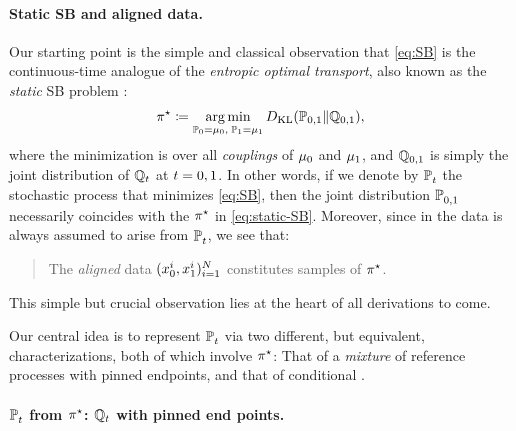 \paragraph{Static SB and aligned data.}

Our starting point is the simple and classical observation that \eqref{eq:SB} is the continuous-time analogue of the \emph{entropic optimal transport}, also known as the \emph{static} \acrlong{SB} problem \citep{leonard2013survey,chen2021stochastic,peyre2019computational}:
\begin{equation}
\label{eq:static-SB}
\Pssol \defeq \argmin_{ \substack{ \Pinit = \distinit, \; \Pend = \distend} } \KL( \mathbb{P}_{0,1} \| \refprobase_{0,1}),
\end{equation}
where the minimization is over all \emph{couplings} of $\distinit$ and $\distend$, and $\refprobase_{0,1}$ is simply the joint distribution of $\refpro$ at $t=0,\horizon$. In other words, if we denote by $\Psol$ the stochastic process that minimizes \eqref{eq:SB}, then the joint distribution $\Psol[0,\horizon]$ necessarily coincides with the $\Pssol$ in \eqref{eq:static-SB}. Moreover, since in  the data is always assumed to arise from $\Psol$, we see that:
\begin{quote}
The \emph{aligned} data $(\x_0^i,\x_1^i)_{i=1}^N$ constitutes samples of $\Pssol$.
\end{quote}
This simple but crucial observation lies at the heart of all derivations to come. 

Our central idea is to represent $\Psol$ via two different, but equivalent, characterizations, both of which involve $\Pssol$: That of a \emph{mixture} of reference processes with pinned endpoints, and that of conditional .

\paragraph{$\Psol$ from $\Pssol$: $\refpro$ with pinned end points.}

